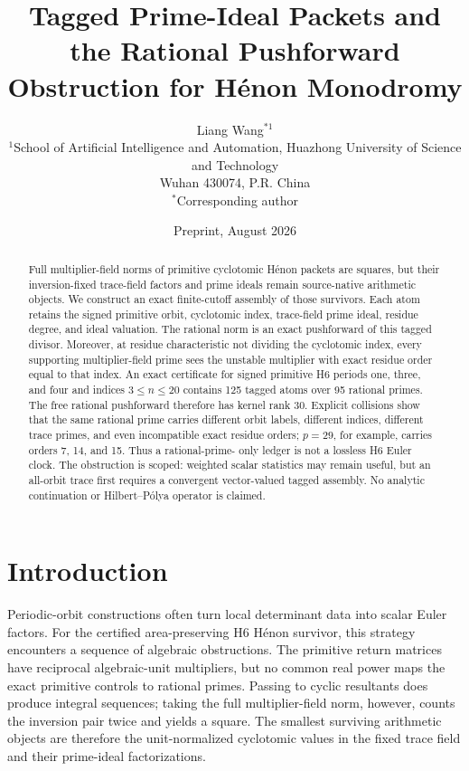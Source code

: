 \documentclass[11pt]{article}
\title{Tagged Prime-Ideal Packets and the Rational Pushforward\\
Obstruction for H\'enon Monodromy}
\author{Liang Wang$^{*1}$\\
\small $^{1}$School of Artificial Intelligence and Automation, Huazhong University of Science and Technology\\
\small Wuhan 430074, P.R. China\\
\small $^*$Corresponding author}
\date{Preprint, August 2026}
\theoremstyle{definition}\newtheorem{definition}[theorem]{Definition}
\theoremstyle{remark}\newtheorem{remark}[theorem]{Remark}
\begin{document}
\maketitle

\begin{abstract}
Full multiplier-field norms of primitive cyclotomic H\'enon packets are
squares, but their inversion-fixed trace-field factors and prime ideals
remain source-native arithmetic objects.  We construct an exact
finite-cutoff assembly of those survivors.  Each atom retains the signed
primitive orbit, cyclotomic index, trace-field prime ideal, residue degree,
and ideal valuation.  The rational norm is an exact pushforward of this
tagged divisor.  Moreover, at residue characteristic not dividing the
cyclotomic index, every supporting multiplier-field prime sees the unstable
multiplier with exact residue order equal to that index.  An exact
certificate for signed primitive H6 periods one, three, and four and indices
$3\le n\le20$ contains 125 tagged atoms over 95 rational primes.  The free
rational pushforward therefore has kernel rank 30.  Explicit collisions
show that the same rational prime carries different orbit labels, different
indices, different trace primes, and even incompatible exact residue orders;
$p=29$, for example, carries orders 7, 14, and 15.  Thus a rational-prime-
only ledger is not a lossless H6 Euler clock.  The obstruction is scoped:
weighted scalar statistics may remain useful, but an all-orbit trace first
requires a convergent vector-valued tagged assembly.  No analytic
continuation or Hilbert--P\'olya operator is claimed.
\end{abstract}

\section{Introduction}

Periodic-orbit constructions often turn local determinant data into scalar
Euler factors.  For the certified area-preserving H6 H\'enon survivor, this
strategy encounters a sequence of algebraic obstructions.  The primitive
return matrices have reciprocal algebraic-unit multipliers, but no common
real power maps the exact primitive controls to rational primes.  Passing to
cyclic resultants does produce integral sequences; taking the full
multiplier-field norm, however, counts the inversion pair twice and yields a
square.  The smallest surviving arithmetic objects are therefore the
unit-normalized cyclotomic values in the fixed trace field and their
prime-ideal factorizations.
\end{document}
